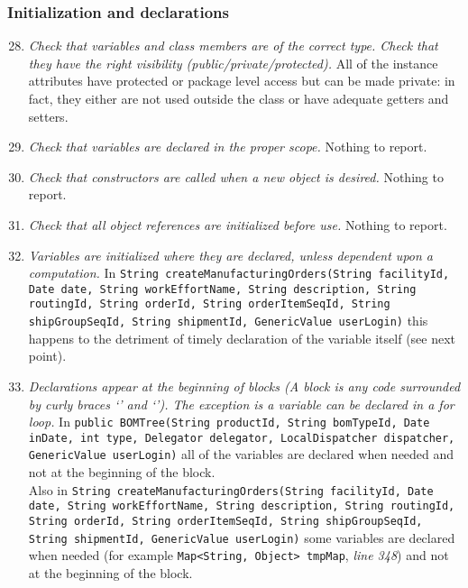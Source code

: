 	\subsubsection{Initialization and declarations}
		\begin{enumerate}
			\setcounter{enumi}{27}
			\item \textit{Check that variables and class members are of the correct type. Check that they have the right visibility (public/private/protected).}\newline
			All of the instance attributes have protected or package level access but can be made private: in fact, they either are not used outside the class or have adequate getters and setters.

			\item \textit{Check that variables are declared in the proper scope.}\newline
			Nothing to report. %

			\item \textit{Check that constructors are called when a new object is desired.}\newline
			Nothing to report. %

			\item \textit{Check that all object references are initialized before use.}\newline
			Nothing to report. %

			\item \textit{Variables are initialized where they are declared, unless dependent upon a computation.}\newline
			In \texttt{String createManufacturingOrders(String facilityId, Date date, String workEffortName, String description, String routingId, String orderId, String orderItemSeqId, String shipGroupSeqId, String shipmentId, GenericValue userLogin)} this happens to the detriment of timely declaration of the variable itself (see next point).

			\item \textit{Declarations appear at the beginning of blocks (A block is any code surrounded by curly braces ‘{’ and ‘}’). The exception is a variable can be declared in a for loop.}\newline
			In \texttt{public BOMTree(String productId, String bomTypeId, Date inDate, int type, Delegator delegator, LocalDispatcher dispatcher, GenericValue userLogin)} all of the variables are declared when needed and not at the beginning of the block.\\
			Also in \texttt{String createManufacturingOrders(String facilityId, Date date, String workEffortName, String description, String routingId, String orderId, String orderItemSeqId, String shipGroupSeqId, String shipmentId, GenericValue userLogin)} some variables are declared when needed (for example \texttt{Map<String, Object> tmpMap}, \textit{line 348}) and not at the beginning of the block. %
		\end{enumerate}

